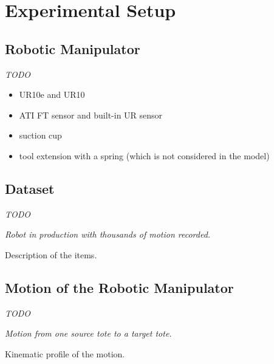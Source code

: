 \documentclass[/home/francois/latex/report/main.tex]{subfiles}
\begin{document}
\chapter{Experimental Setup}
\label{chapter:setup}

\section{Robotic Manipulator}

\textit{TODO}

{\it
\begin{itemize}
  \item UR10e and UR10
  \item ATI \ac{FT} sensor and built-in \ac{UR} sensor
  \item suction cup
  \item tool extension with a spring (which is not considered in the model)
\end{itemize}
}

\section{Dataset}

\textit{TODO}

{\it
Robot in production with thousands of motion recorded.

Description of the items.
}

\section{Motion of the Robotic Manipulator}


\textit{TODO}

{\it
Motion from one source tote to a target tote.

Kinematic profile of the motion.
}
\end{document}
